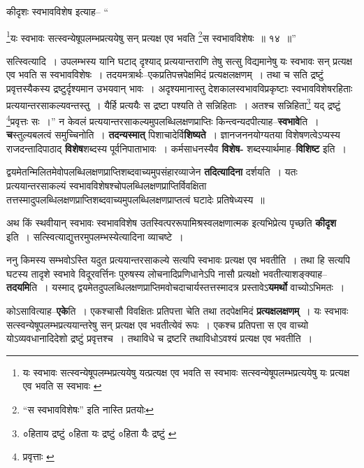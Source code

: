 \documentclass[article,12pt,a4paper]{memoir}
\begin{document}
	कीदृशः स्वभावविशेष इत्याह-- “
	  
	\footnote{यः स्वभावः सत्स्वन्येषूपलम्भप्रत्ययेषु यत्प्रत्यक्ष एव भवति स स्वभावः \cite{dp-msB} \cite{dp-edP} \cite{dp-edH} सत्स्वन्येषूपलम्भप्रत्ययेषु यः प्रत्यक्ष एव भवति स स्वभावः \cite{dp-edE}}\-यः स्वभावः सत्स्वन्येषूपलम्भप्रत्ययेषु सन् प्रत्यक्ष एव भवति \footnote{“स स्वभावविशेषः” इति नास्ति \cite{dp-msC} \cite{dp-msD} प्रतयोः}\-स स्वभावविशेषः ॥ १४ ॥” 
	  
	सत्स्वित्यादि । उपलम्भस्य यानि घटाद् दृश्याद् प्रत्ययान्तराणि तेषु सत्सु विद्यमानेषु यः स्वभावः सन् प्रत्यक्ष एव भवति स स्वभावविशेषः । तदयमत्रार्थः--एकप्रतिपत्त्रपेक्षमिदं प्रत्यक्षलक्षणम् । तथा च सति द्रष्टुं प्रवृत्तस्यैकस्य द्रष्टुर्दृश्यमान उभयवान् भावः । अदृश्यमानास्तु देशकालस्वभावविप्रकृष्टाः स्वभावविशेषरहिताः प्रत्ययान्तरसाकल्यवन्तस्तु । यैर्हि प्रत्ययैः स द्रष्टा पश्यति ते सन्निहिताः । अतश्च सन्निहिता\footnote{०हिताय द्रष्टुं \cite{dp-msA} \cite{dp-edP} \cite{dp-edE} ०हिता यः द्रष्टुं \cite{dp-edH} ०हिता यैः द्रष्टुं \cite{dp-edN}} यद् द्रष्टुं \footnote{प्रवृत्ताः \cite{dp-msB}}\-प्रवृत्तः सः ।” न केवलं प्रत्ययान्तरसाकल्यमुपलब्धिलक्षणप्राप्तिः किन्त्वन्यदपीत्याह--\textbf{स्वभावे}ति । \textbf{च}स्तुल्यबलत्वं समुच्चिनोति । \textbf{तदन्यस्मात्} पिशाचादेर्वि\textbf{शिष्यते} । ज्ञानजननयोग्यतया विशेषणत्वेऽप्यस्य राजदन्तादिपाठाद् \textbf{विशेष}शब्दस्य पूर्वनिपाता\leavevmode{}भावः । कर्मसाधनस्यैव \textbf{विशेष-} शब्दस्यार्थमाह--\textbf{विशिष्ट} इति ।
	\pend
      

	  \pstart द्वयमेतन्मिलितमेवोपलब्धिलक्षणप्राप्तिशब्दवाच्यमुपसंहारव्याजेन \textbf{तदित्यादिना} दर्शयति । यतः प्रत्ययान्तरसाकल्यं स्वभावविशेषश्चोपलब्धिलक्षणप्राप्तिर्विवक्षिता तत्तस्मादुपलब्धिलक्षणप्राप्तिशब्दवाच्यमुपलब्धिलक्षणप्राप्तत्वं घटादेः प्रतिषेध्यस्य ॥
	\pend
      

	  \pstart अथ किं स्थवीयान् स्वभावः स्वभावविशेष उतस्वित्पररूपामिश्रस्वलक्षणात्मक इत्यभिप्रेत्य पृच्छति \textbf{कीदृश} इति । सत्स्वित्याद्युत्तरमुपलम्भस्येत्यादिना व्याचष्टे ।
	\pend
      

	  \pstart ननु किमस्य सम्भवोऽस्ति यदुत प्रत्ययान्तरसाकल्ये सत्यपि स्वभावः प्रत्यक्ष एव भवतीति । तथा हि सत्यपि घटस्य तादृशे स्वभावे विदूरवर्त्तिनः पुरुषस्य लोचनादिप्रणिधानेऽपि नासौ प्रत्यक्षो भवतीत्याशङ्क्याह--\textbf{तदयमि}ति । यस्माद् द्वयमेतदुपलब्धिलक्षणप्राप्तिमवोचदाचार्यस्तत्तस्मादत्र प्रस्तावेऽ\textbf{यमर्थो} वाच्योऽभिमतः ।
	\pend
      

	  \pstart कोऽसावित्याह--\textbf{एके}ति । एकश्चासौ विवक्षितः प्रतिपत्ता चेति तथा तदपेक्षमिदं \textbf{प्रत्यक्षलक्षणम्} । यः स्वभावः सत्स्वन्येषूपलम्भप्रत्ययान्तरेषु सन् प्रत्यक्ष एव भवतीत्येवं रूपः । एकश्च प्रतिपत्ता स एव वाच्यो योऽव्यवधानादिदेशो द्रष्टुं प्रवृत्तश्च । तथाविधे च द्रष्टरि तथाविधोऽवश्यं प्रत्यक्ष एव भवतीति ।
	\pend
      
\end{document}
